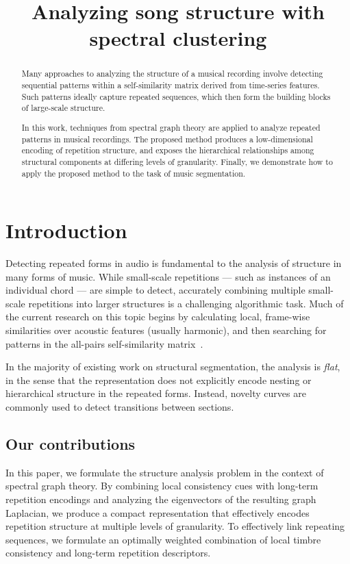 \documentclass{article}
\title{Analyzing song structure with spectral clustering}
\begin{document}
%
\maketitle
%
\begin{abstract}
Many approaches to analyzing the structure of a musical recording involve detecting
sequential patterns within a self-similarity matrix derived from time-series features.
Such patterns ideally capture repeated sequences, which then form the building blocks
of large-scale structure.

In this work, techniques from spectral graph theory are applied to analyze repeated
patterns in musical recordings.  The proposed method produces a low-dimensional
encoding of repetition structure, and exposes the hierarchical relationships among
structural components at differing levels of granularity.  Finally, we demonstrate how
to apply the proposed method to the task of music segmentation.
\end{abstract}
%
\section{Introduction}
\label{sec:introduction}
Detecting repeated forms in audio is fundamental to the analysis of structure in many 
forms of music.  While small-scale repetitions --- such as instances of an
individual chord --- are simple to detect, accurately combining multiple 
small-scale repetitions into larger structures is a challenging algorithmic task.
Much of the current research on this topic begins by calculating local, frame-wise
similarities over acoustic features (usually harmonic), and then searching for
patterns in the all-pairs self-similarity matrix~\cite{foote2000automatic}.

In the majority of existing work on structural segmentation, the analysis is
\emph{flat}, in the sense that the representation does not explicitly encode nesting
or hierarchical structure in the repeated forms.  Instead, novelty curves are commonly
used to detect transitions between sections. 

\subsection{Our contributions}
In this paper, we formulate the structure analysis problem in the context of spectral
graph theory.  By combining local consistency cues with long-term repetition encodings
and analyzing the eigenvectors of the resulting graph Laplacian, we produce a compact
representation that effectively encodes repetition structure at multiple levels of
granularity.  To effectively link repeating sequences, we formulate an optimally
weighted combination of local timbre consistency and long-term repetition descriptors.
\end{document}
